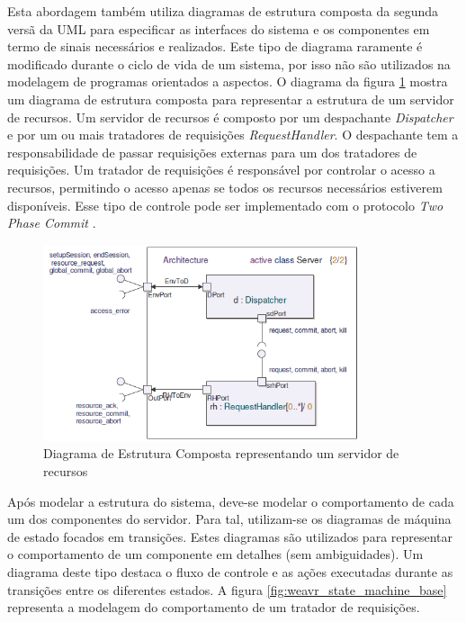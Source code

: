 Esta abordagem também utiliza diagramas de estrutura composta da segunda versã da UML para especificar as interfaces do sistema e os componentes em
termo de sinais necessários e realizados. Este tipo de diagrama raramente é modificado durante o ciclo de vida de um sistema, por isso não são
utilizados na modelagem de programas orientados a aspectos. O diagrama da figura \ref{fig:weavr_composite_structure} mostra um diagrama de estrutura
composta para representar a estrutura de um servidor de recursos. Um servidor de recursos é composto por um despachante \textit{Dispatcher} e por um
ou mais tratadores de requisições \textit{RequestHandler}. O despachante tem a responsabilidade de passar requisições externas para um dos tratadores
de requisições. Um tratador de requisições é responsável por controlar o acesso a recursos, permitindo o acesso apenas se todos os recursos
necessários estiverem disponíveis. Esse tipo de controle pode ser implementado com o protocolo \textit{Two Phase Commit} .

\begin{figure}
	\centering
	\includegraphics[width=350px]{img/weavr_composite_structure.png}
	\caption{Diagrama de Estrutura Composta
	representando um servidor de recursos}\label{fig:weavr_composite_structure}
\end{figure}

Após modelar a estrutura do sistema, deve-se modelar o comportamento de cada um dos componentes do servidor. Para tal, utilizam-se os diagramas de
máquina de estado focados em transições. Estes diagramas são utilizados para representar o comportamento de um componente em detalhes (sem
ambiguidades). Um diagrama deste tipo destaca o fluxo de controle e as ações executadas durante as transições entre os diferentes estados. A figura
\ref{fig:weavr_state_machine_base} representa a modelagem do comportamento de um tratador de requisições.

